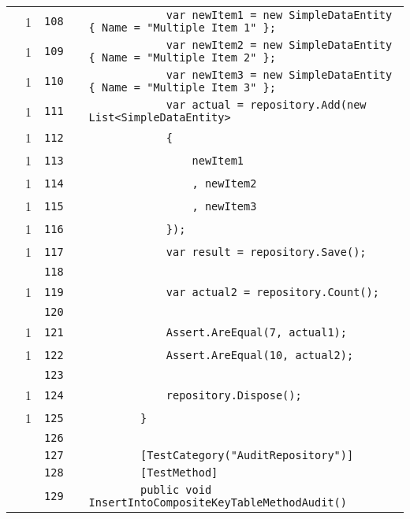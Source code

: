\documentclass[a4paper,10pt]{article}
\begin{document}
\begin{longtable}[l]{lrrll}
\cellcolor{green} & 1 & \verb~108~ & & \verb~            var newItem1 = new SimpleDataEntity { Name = "Multiple Item 1" };~\\
\cellcolor{green} & 1 & \verb~109~ & & \verb~            var newItem2 = new SimpleDataEntity { Name = "Multiple Item 2" };~\\
\cellcolor{green} & 1 & \verb~110~ & & \verb~            var newItem3 = new SimpleDataEntity { Name = "Multiple Item 3" };~\\
\cellcolor{green} & 1 & \verb~111~ & & \verb~            var actual = repository.Add(new List<SimpleDataEntity>~\\
\cellcolor{green} & 1 & \verb~112~ & & \verb~            {~\\
\cellcolor{green} & 1 & \verb~113~ & & \verb~                newItem1~\\
\cellcolor{green} & 1 & \verb~114~ & & \verb~                , newItem2~\\
\cellcolor{green} & 1 & \verb~115~ & & \verb~                , newItem3~\\
\cellcolor{green} & 1 & \verb~116~ & & \verb~            });~\\
\cellcolor{green} & 1 & \verb~117~ & & \verb~            var result = repository.Save();~\\
\cellcolor{gray} &  & \verb~118~ & & \verb~~\\
\cellcolor{green} & 1 & \verb~119~ & & \verb~            var actual2 = repository.Count();~\\
\cellcolor{gray} &  & \verb~120~ & & \verb~~\\
\cellcolor{green} & 1 & \verb~121~ & & \verb~            Assert.AreEqual(7, actual1);~\\
\cellcolor{green} & 1 & \verb~122~ & & \verb~            Assert.AreEqual(10, actual2);~\\
\cellcolor{gray} &  & \verb~123~ & & \verb~~\\
\cellcolor{green} & 1 & \verb~124~ & & \verb~            repository.Dispose();~\\
\cellcolor{green} & 1 & \verb~125~ & & \verb~        }~\\
\cellcolor{gray} &  & \verb~126~ & & \verb~~\\
\cellcolor{gray} &  & \verb~127~ & & \verb~        [TestCategory("AuditRepository")]~\\
\cellcolor{gray} &  & \verb~128~ & & \verb~        [TestMethod]~\\
\cellcolor{gray} &  & \verb~129~ & & \verb~        public void InsertIntoCompositeKeyTableMethodAudit()~\\

\end{longtable}
\end{document}
